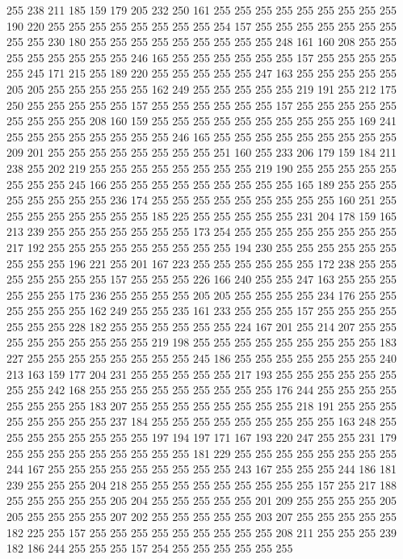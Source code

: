 255 238 211 185 159 179 205 232 250 161 255 255 255 255 255 255 255 255 255 190
220 255 255 255 255 255 255 255 255 254 157 255 255 255 255 255 255 255 255 255
230 180 255 255 255 255 255 255 255 255 255 248 161 160 208 255 255 255 255 255
255 255 255 246 165 255 255 255 255 255 255 157 255 255 255 255 255 245 171 215
255 189 220 255 255 255 255 255 247 163 255 255 255 255 255 205 205 255 255 255
255 255 162 249 255 255 255 255 255 219 191 255 212 175 250 255 255 255 255 255
157 255 255 255 255 255 255 157 255 255 255 255 255 255 255 255 255 208 160 159
255 255 255 255 255 255 255 255 255 255 169 241 255 255 255 255 255 255 255 255
246 165 255 255 255 255 255 255 255 255 255 209 201 255 255 255 255 255 255 255
255 251 160 255 233 206 179 159 184 211 238 255 202 219 255 255 255 255 255 255
255 255 219 190 255 255 255 255 255 255 255 255 245 166 255 255 255 255 255 255
255 255 255 165 189 255 255 255 255 255 255 255 255 236 174 255 255 255 255 255
255 255 255 255 160 251 255 255 255 255 255 255 255 255 185 225 255 255 255 255
255 231 204 178 159 165 213 239 255 255 255 255 255 255 255 173 254 255 255 255
255 255 255 255 255 217 192 255 255 255 255 255 255 255 255 255 194 230 255 255
255 255 255 255 255 255 255 196 221 255 201 167 223 255 255 255 255 255 255 172
238 255 255 255 255 255 255 255 157 255 255 255 226 166 240 255 255 247 163 255
255 255 255 255 255 175 236 255 255 255 255 205 205 255 255 255 255 234 176 255
255 255 255 255 255 162 249 255 255 235 161 233 255 255 255 157 255 255 255 255
255 255 255 228 182 255 255 255 255 255 255 224 167 201 255 214 207 255 255 255
255 255 255 255 255 255 219 198 255 255 255 255 255 255 255 255 255 183 227 255
255 255 255 255 255 255 255 245 186 255 255 255 255 255 255 255 240 213 163 159
177 204 231 255 255 255 255 255 217 193 255 255 255 255 255 255 255 255 242 168
255 255 255 255 255 255 255 255 255 176 244 255 255 255 255 255 255 255 255 183
207 255 255 255 255 255 255 255 255 218 191 255 255 255 255 255 255 255 255 237
184 255 255 255 255 255 255 255 255 255 163 248 255 255 255 255 255 255 255 255
197 194 197 171 167 193 220 247 255 255 231 179 255 255 255 255 255 255 255 255
255 181 229 255 255 255 255 255 255 255 255 244 167 255 255 255 255 255 255 255
255 255 243 167 255 255 255 244 186 181 239 255 255 255 204 218 255 255 255 255
255 255 255 255 255 157 255 217 188 255 255 255 255 255 205 204 255 255 255 255
255 201 209 255 255 255 255 205 205 255 255 255 255 207 202 255 255 255 255 255
203 207 255 255 255 255 255 182 225 255 157 255 255 255 255 255 255 255 255 255
208 211 255 255 255 239 182 186 244 255 255 255 157 254 255 255 255 255 255 255
